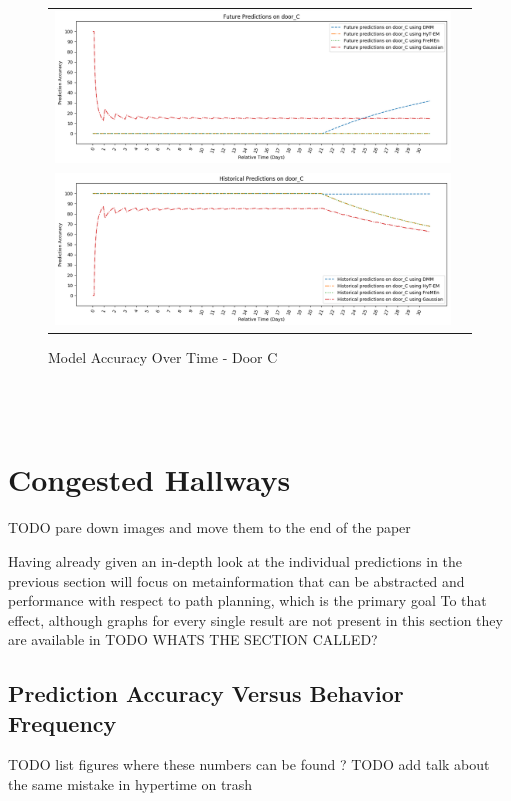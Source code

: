 \begin{center}
\begin{figure}[!Hp]
  \begin{tabular}{cc}
    {\includegraphics[width = 6in]{images/results/Future_Predictions_on_door_C.png}} \\
    {\includegraphics[width = 6in]{images/results/Historical_Predictions_on_door_C.png}} \\
  \end{tabular}
  \caption{Model Accuracy Over Time - Door C}
\end{figure}\\ \\
\end{center}


\section{ Congested Hallways }
TODO pare down images and move them to the end of the paper

Having already given an in-depth look at the individual predictions in the
previous section will
focus on metainformation that can be abstracted and
performance with respect to path planning, which is the primary goal
To that effect, although graphs for every single result are not
present in this section they are available in TODO WHATS THE SECTION CALLED? \\

\subsection{ Prediction Accuracy Versus Behavior Frequency }
TODO list figures where these numbers can be found ?
TODO add talk about the same mistake in hypertime on trash

